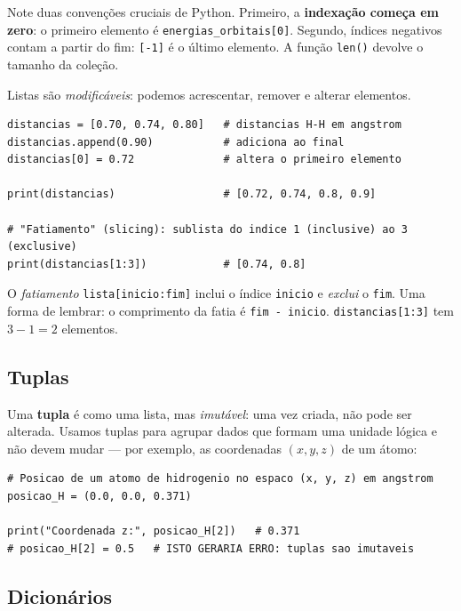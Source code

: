 \documentclass[11pt,a4paper,openany]{book}
\newcommand{\code}[1]{\texttt{#1}}
\newcommand{\python}{\textsf{Python}}
\begin{document}
\noindent
Note duas convenções cruciais de \python{}. Primeiro, a \textbf{indexação começa em
zero}: o primeiro elemento é \code{energias\_orbitais[0]}. Segundo, índices
negativos contam a partir do fim: \code{[-1]} é o último elemento. A função
\code{len()} devolve o tamanho da coleção.

Listas são \emph{modificáveis}: podemos acrescentar, remover e alterar elementos.

\begin{lstlisting}[style=python,caption={Modificando uma lista.}]
distancias = [0.70, 0.74, 0.80]   # distancias H-H em angstrom
distancias.append(0.90)           # adiciona ao final
distancias[0] = 0.72              # altera o primeiro elemento

print(distancias)                 # [0.72, 0.74, 0.8, 0.9]

# "Fatiamento" (slicing): sublista do indice 1 (inclusive) ao 3 (exclusive)
print(distancias[1:3])            # [0.74, 0.8]
\end{lstlisting}

\begin{caixadica}
O \emph{fatiamento} \code{lista[inicio:fim]} inclui o índice \code{inicio} e
\emph{exclui} o \code{fim}. Uma forma de lembrar: o comprimento da fatia é
\code{fim - inicio}. \code{distancias[1:3]} tem $3-1=2$ elementos.
\end{caixadica}

\subsection{Tuplas}

Uma \textbf{tupla} é como uma lista, mas \emph{imutável}: uma vez criada, não pode
ser alterada. Usamos tuplas para agrupar dados que formam uma unidade lógica e
não devem mudar --- por exemplo, as coordenadas $(x, y, z)$ de um átomo:

\begin{lstlisting}[style=python,caption={Coordenadas atômicas como tuplas.}]
# Posicao de um atomo de hidrogenio no espaco (x, y, z) em angstrom
posicao_H = (0.0, 0.0, 0.371)

print("Coordenada z:", posicao_H[2])   # 0.371
# posicao_H[2] = 0.5   # ISTO GERARIA ERRO: tuplas sao imutaveis
\end{lstlisting}

\subsection{Dicionários}
\end{document}
